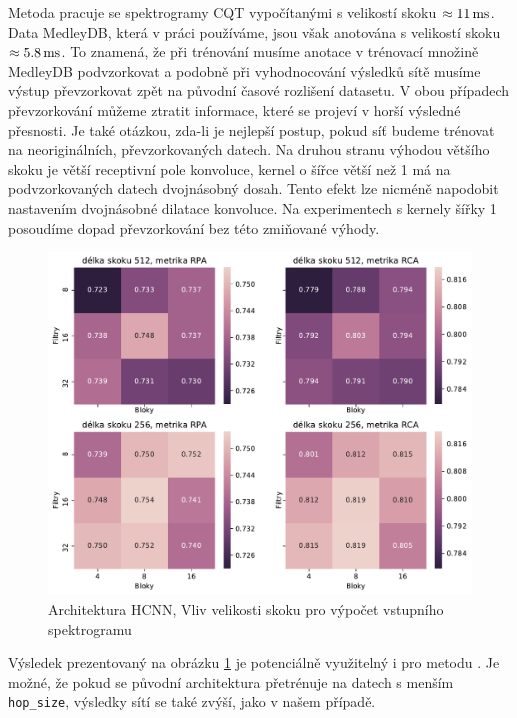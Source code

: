 Metoda \cite{Bittner2017} pracuje se spektrogramy CQT vypočítanými s velikostí skoku $\approx 11\,\rm ms$. Data MedleyDB, která v práci používáme, jsou však anotována s velikostí skoku $\approx 5.8\,\rm ms$. To znamená, že při trénování musíme anotace v trénovací množině MedleyDB podvzorkovat a podobně při vyhodnocování výsledků sítě musíme výstup převzorkovat zpět na původní časové rozlišení datasetu. V obou případech převzorkování můžeme ztratit informace, které se projeví v horší výsledné přesnosti. Je také otázkou, zda-li je nejlepší postup, pokud síť budeme trénovat na neoriginálních, převzorkovaných datech. Na druhou stranu výhodou většího skoku je větší receptivní pole konvoluce, kernel o šířce větší než 1 má na podvzorkovaných datech dvojnásobný dosah. Tento efekt lze nicméně napodobit nastavením dvojnásobné dilatace konvoluce. Na experimentech s kernely šířky 1 posoudíme dopad převzorkování bez této zmiňované výhody.

\begin{figure}[h]\centering
    \includegraphics[scale=0.55]{../img/figures/spectrogram_512_vs_256}
\caption{Architektura HCNN, Vliv velikosti skoku pro výpočet vstupního spektrogramu}\label{obr:spectrogram_512_vs_256}
\end{figure}

Výsledek prezentovaný na obrázku \ref{obr:spectrogram_512_vs_256} je potenciálně využitelný i pro metodu \cite{Bittner2017}. Je možné, že pokud se původní architektura přetrénuje na datech s menším \texttt{hop\_size}, výsledky sítí se také zvýší, jako v našem případě.

